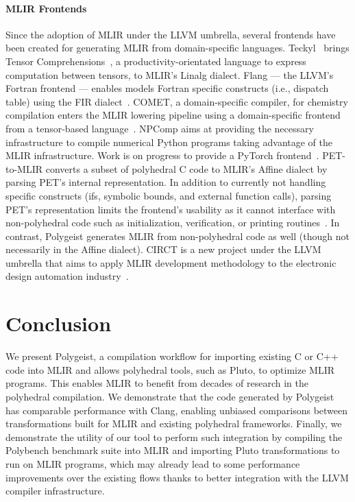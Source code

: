 \documentclass[sigplan]{acmart}
\newcommand{\tool}{Polygeist\xspace}
\begin{document}
\paragraph{MLIR Frontends}
Since the adoption of MLIR under the LLVM umbrella, several frontends have been created for generating MLIR from domain-specific languages. Teckyl~\cite{teckyl} brings Tensor Comprehensions~\cite{tc}, a productivity-orientated language to express computation between tensors, to MLIR's Linalg dialect. Flang --- the LLVM's Fortran frontend --- enables models Fortran specific constructs (i.e., dispatch table) using the FIR dialect~\cite{flang}. COMET, a domain-specific compiler, for chemistry compilation enters the MLIR lowering pipeline using a domain-specific frontend from a tensor-based language~\cite{comet}. NPComp aims at providing the necessary infrastructure to compile numerical Python programs taking advantage of the MLIR infrastructure. Work is on progress to provide a PyTorch frontend~\cite{npcomp}. PET-to-MLIR converts a subset of polyhedral C code to MLIR's Affine dialect by parsing PET's internal representation. In addition to currently not handling specific constructs (ifs, symbolic bounds, and external function calls), parsing PET's representation limits the frontend's usability as it cannot interface with non-polyhedral code such as initialization, verification, or printing routines~\cite{komisarczyk2020pet}. In contrast, \tool generates MLIR from non-polyhedral code as well (though not necessarily in the Affine dialect). CIRCT is a new project under the LLVM umbrella that aims to apply MLIR development methodology to the electronic design automation industry~\cite{circt}.

\section{Conclusion}
We present \tool, a compilation workflow for importing existing C or C++ code into MLIR and allows polyhedral tools, such as Pluto, to optimize MLIR programs. This enables MLIR to benefit from decades of research in the polyhedral compilation. We demonstrate that the code generated by \tool has comparable performance with Clang, enabling unbiased comparisons between transformations built for MLIR and existing polyhedral frameworks. Finally, we demonstrate the utility of our tool to perform such integration by compiling the Polybench benchmark suite into MLIR and importing Pluto transformations to run on MLIR programs, which may already lead to some performance improvements over the existing flows thanks to better integration with the LLVM compiler infrastructure.
\end{document}
